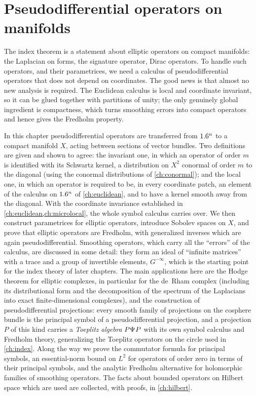 \chapter{Pseudodifferential operators on manifolds}\label{ch:manifolds}
\providecommand{\Gsm}{G^{-\infty}}
\providecommand{\Symq}[1]{S^{#1-[1]}}
\usetikzlibrary{patterns}

The index theorem is a statement about elliptic operators on compact
manifolds: the Laplacian on forms, the signature operator, Dirac operators.
To handle such operators, and their parametrices, we need a calculus of
pseudodifferential operators that does not depend on coordinates. The good
news is that almost no new analysis is required. The Euclidean calculus is
local and coordinate invariant, so it can be glued together with partitions
of unity; the only genuinely global ingredient is compactness, which turns
smoothing errors into compact operators and hence gives the Fredholm property.

In this chapter pseudodifferential operators are transferred from $1.6^n$ to a
compact manifold $X$, acting between sections of vector bundles. Two definitions
are given and shown to agree: the invariant one, in which an operator of order
$m$ is identified with its Schwartz kernel, a distribution on $X^2$ conormal of
order $m$ to the diagonal (using the conormal distributions of
\cref{ch:conormal}); and the local one, in which an operator is required to be,
in every coordinate patch, an element of the calculus on $1.6^n$ of
\cref{ch:euclidean}, and to have a kernel smooth away from the diagonal. With
the coordinate invariance established in \cref{ch:euclidean,ch:microlocal},
the whole symbol calculus carries over. We then construct parametrices for
elliptic operators, introduce Sobolev spaces on $X$, and prove that elliptic
operators are Fredholm, with generalized inverses which are again
pseudodifferential. Smoothing operators, which carry all the ``errors'' of the
calculus, are discussed in some detail: they form an ideal of ``infinite
matrices'' with a trace and a group of invertible elements, $\Gsm$, which is
the starting point for the index theory of later chapters. The main
applications here are the Hodge theorem for elliptic complexes, in particular
for the de~Rham complex (including its distributional form and the
decomposition of the spectrum of the Laplacians into exact finite-dimensional
complexes), and the construction of pseudodifferential projections: every
smooth family of projections on the cosphere bundle is the principal symbol of
a pseudodifferential projection, and a projection $P$ of this kind carries a
\emph{Toeplitz algebra} $P\Psi^{}P$ with its own symbol calculus and Fredholm
theory, generalizing the Toeplitz operators on the circle used in
\cref{ch:index}. Along the way we prove the commutator formula for principal
symbols, an essential-norm bound on $L^2$ for operators of order zero in
terms of their principal symbols, and the analytic Fredholm alternative for holomorphic families of
smoothing operators. The facts about bounded operators on Hilbert space
which are used are collected, with proofs, in \cref{ch:hilbert}.

